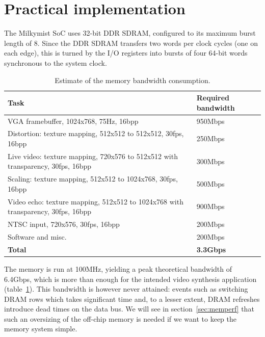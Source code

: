 \documentclass[a4paper,11pt]{kthesis}
\begin{document}
\section{Practical implementation}
\label{sec:memimpl}
The Milkymist SoC uses 32-bit DDR SDRAM, configured to its maximum burst length of 8. Since the DDR SDRAM transfers two words per clock cycles (one on each edge), this is turned by the I/O registers into bursts of four 64-bit words synchronous to the system clock.

\begin{table}
\centering
\begin{tabularx}{13cm}{|X|l|}
\hline
\textbf{Task} & \textbf{Required bandwidth} \\
\hline
VGA framebuffer, 1024x768, 75Hz, 16bpp & 950Mbps \\
\hline
Distortion: texture mapping, 512x512 to 512x512, 30fps, 16bpp & 250Mbps \\
\hline
Live video: texture mapping, 720x576 to 512x512 with transparency, 30fps, 16bpp & 300Mbps \\
\hline
Scaling: texture mapping, 512x512 to 1024x768, 30fps, 16bpp & 500Mbps \\
\hline
Video echo: texture mapping, 512x512 to 1024x768 with transparency, 30fps, 16bpp & 900Mbps \\
\hline
NTSC input, 720x576, 30fps, 16bpp & 200Mbps \\
\hline
Software and misc. & 200Mbps \\
\hline
\textbf{Total} & \textbf{3.3Gbps} \\
\hline
\end{tabularx}
\caption{Estimate of the memory bandwidth consumption.}\label{tab:membw}
\end{table}

The memory is run at 100MHz, yielding a peak theoretical bandwidth of 6.4Gbps, which is more than enough for the intended video synthesis application (table~\ref{tab:membw}). This bandwidth is however never attained: events such as switching DRAM rows which takes significant time and, to a lesser extent, DRAM refreshes introduce dead times on the data bus. We will see in section~\ref{sec:memperf} that such an oversizing of the off-chip memory is needed if we want to keep the memory system simple.
\end{document}
